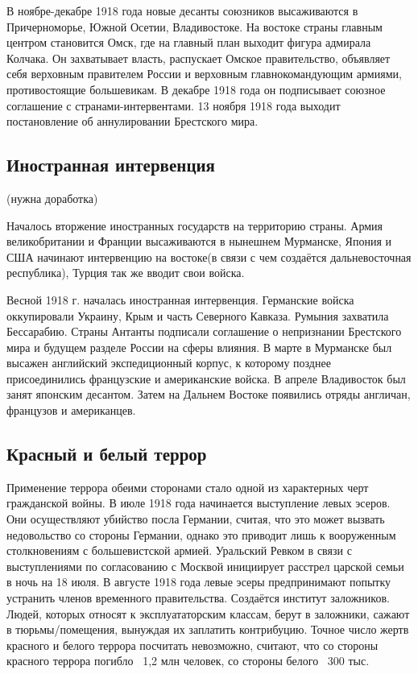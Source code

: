 В ноябре-декабре 1918 года новые десанты союзников высаживаются в Причерноморье, Южной Осетии, Владивостоке.
На востоке страны главным центром становится Омск, где на главный план выходит фигура адмирала Колчака. Он захватывает власть, распускает Омское правительство, объявляет себя верховным правителем России и верховным главнокомандующим армиями, противостоящие большевикам. В декабре 1918 года он подписывает союзное соглашение с странами-интервентами.
13 ноября 1918 года выходит постановление об аннулировании Брестского мира.

\subsection{Иностранная интервенция} (нужна доработка)

Началось вторжение иностранных государств на территорию страны. Армия великобритании и Франции высаживаются в нынешнем Мурманске, Япония и США начинают интервенцию на востоке(в связи с чем создаётся дальневосточная республика), Турция так же вводит свои войска.

Весной 1918 г. началась иностранная интервенция. Германские войска оккупировали
Украину, Крым и часть Северного Кавказа. Румыния захватила Бессарабию. Страны Антанты
подписали соглашение о непризнании Брестского мира и будущем разделе России на сферы
влияния. В марте в Мурманске был высажен английский экспедиционный корпус, к которому
позднее присоединились французские и американские войска. В апреле Владивосток был занят
японским десантом. Затем на Дальнем Востоке появились отряды англичан, французов и
американцев.

\subsection{Красный и белый террор}

Применение террора обеими сторонами стало одной из характерных черт гражданской войны.
В июле 1918 года начинается выступление левых эсеров. Они осуществляют убийство посла Германии, считая, что это может вызвать недовольство со стороны Германии, однако это приводит лишь к вооруженным столкновениям с большевистской армией.
Уральский Ревком в связи с выступлениями по согласованию с Москвой инициирует расстрел царской семьи в ночь на 18 июля. 
В августе 1918 года левые эсеры предпринимают попытку устранить членов временного правительства.
Создаётся институт заложников. Людей, которых относят к эксплуататорским классам, берут в заложники, сажают в тюрьмы/помещения, вынуждая их заплатить контрибуцию. 
Точное число жертв красного и белого террора посчитать невозможно, считают, что со стороны красного террора погибло ~1,2 млн человек, со стороны белого ~300 тыс.

